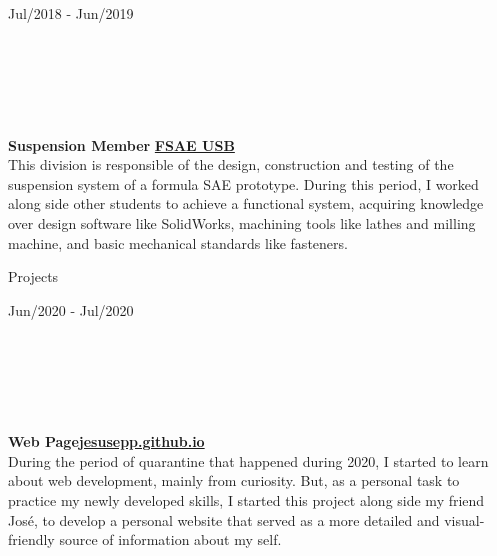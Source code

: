 \documentclass[10pt]{article}
\begin{document}
\begin{vwcol}[widths={0.235,0.765},
 sep=.8cm, rule=0pt,indent=0em,lines=6]
    \hspace{5pt}Jul/2018 - Jun/2019\par
    \hfill\\
    \hfill\\
    \hfill\\
    \hfill\\
    \hfill\\
    \textbf{Suspension Member}
    \hfill
    \href{http://fsaeusb.com.ve/}{\color{blue!50!black}\textbf{FSAE USB}}\\
    \vspace{5pt}
    This division is responsible of the design, construction and testing of the suspension system of a formula SAE prototype. During this period, I worked along side other students to achieve a functional system, acquiring knowledge over design software like SolidWorks, machining tools like lathes and milling machine, and basic mechanical standards like fasteners.\par
\end{vwcol}

\begin{LARGE}
    \color{blue!50!black} Projects\par
\end{LARGE}


\begin{vwcol}[widths={0.235,0.765},
 sep=.8cm, rule=0pt,indent=0em,lines=6] 
\hspace{5pt}Jun/2020 - Jul/2020\par
    \hfill\\
    \hfill\\
    \hfill\\
    \hfill\\
    \hfill\\
    \textbf{Web Page}\hfill \href{https://jesusepp.github.io/}{\color{blue!50!black}\textbf{jesusepp.github.io}}\\
    \vspace{5pt}
    During the period of quarantine that happened during 2020, I started to learn about web development, mainly from curiosity. But, as a personal task to practice my newly developed skills, I started this project along side my friend José, to develop a personal website that served as a more detailed and visual-friendly source of information about my self.\par
\end{vwcol}
\end{document}
